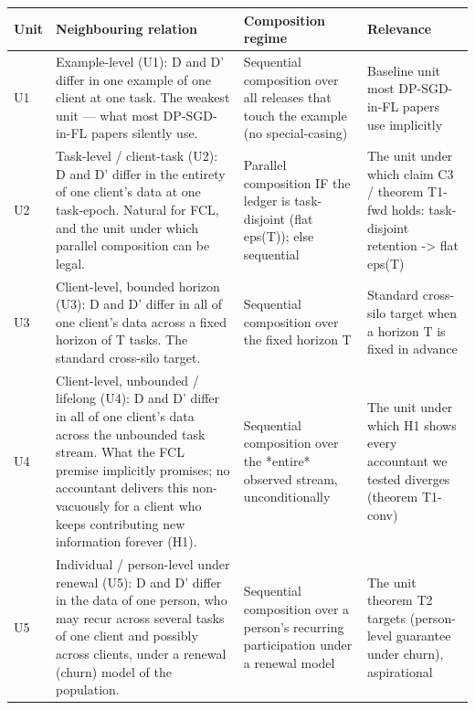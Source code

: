 \begin{tabular}{lp{5cm}p{4cm}p{4cm}}
\toprule
Unit & Neighbouring relation & Composition regime & Relevance \\
\midrule
U1 & Example-level (U1): D and D' differ in one example of one client at one task. The weakest unit — what most DP-SGD-in-FL papers silently use. & Sequential composition over all releases that touch the example (no special-casing) & Baseline unit most DP-SGD-in-FL papers use implicitly \\
U2 & Task-level / client-task (U2): D and D' differ in the entirety of one client's data at one task-epoch. Natural for FCL, and the unit under which parallel composition can be legal. & Parallel composition IF the ledger is task-disjoint (flat eps(T)); else sequential & The unit under which claim C3 / theorem T1-fwd holds: task-disjoint retention -> flat eps(T) \\
U3 & Client-level, bounded horizon (U3): D and D' differ in all of one client's data across a fixed horizon of T tasks. The standard cross-silo target. & Sequential composition over the fixed horizon T & Standard cross-silo target when a horizon T is fixed in advance \\
U4 & Client-level, unbounded / lifelong (U4): D and D' differ in all of one client's data across the unbounded task stream. What the FCL premise implicitly promises; no accountant delivers this non-vacuously for a client who keeps contributing new information forever (H1). & Sequential composition over the *entire* observed stream, unconditionally & The unit under which H1 shows every accountant we tested diverges (theorem T1-conv) \\
U5 & Individual / person-level under renewal (U5): D and D' differ in the data of one person, who may recur across several tasks of one client and possibly across clients, under a renewal (churn) model of the population. & Sequential composition over a person's recurring participation under a renewal model & The unit theorem T2 targets (person-level guarantee under churn), aspirational \\
\bottomrule
\end{tabular}
